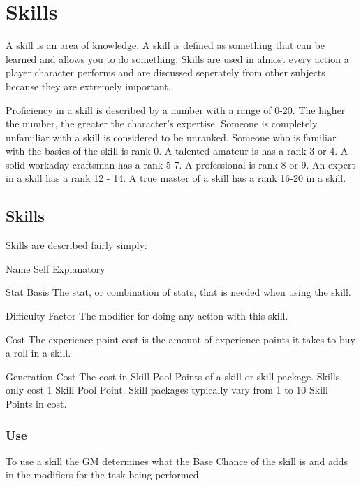 \chapter{Skills}

A {skill} is an area of knowledge. A skill is defined as something that can
be learned and allows you to do something. Skills are used in almost every
action a player character performs and are discussed seperately from
other subjects because they are extremely important.

Proficiency in a skill is described by a number with a range of 0-20.
The higher the number, the greater the character's expertise. Someone
is completely unfamiliar with a skill is considered to be
{unranked}. Someone who is familiar with the basics of
the skill is rank 0. A talented amateur is has a rank 3 or 4. A
solid workaday craftsman has a rank 5-7. A professional is rank 8 or 9. 
An expert in a skill has a rank 12 - 14.
A true master of a skill has a rank 16-20 in a skill. 

\section{Skills}

{Skills} are described fairly simply:

\begin{relate}
	\item[Name] 
	Self Explanatory
	\item[Stat Basis] 
	The stat, or combination of stats, that is needed
	when using the skill.
	\item[Difficulty Factor] 
	The modifier for doing any action with this skill.
	\item[Cost] 
	The experience point cost is the amount of experience points it takes to
	buy a roll in a skill. 
	\item[Generation Cost]
	The cost in Skill Pool Points of a skill or skill package. Skills
	only cost 1 Skill Pool Point. Skill packages typically vary from 1
	to 10 Skill Points in cost.
\end{relate}

\subsection{Use}

To use a skill the GM determines what the Base Chance of the skill is 
and adds in the modifiers for the task being performed.

